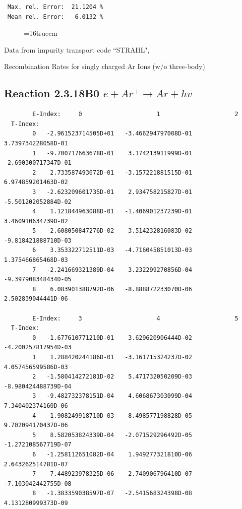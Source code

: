 \documentclass[12pt,dvipdfmx]{article}
\begin{document}
\begin{small}
\begin{verbatim}
 Max. rel. Error:  21.1204 %
 Mean rel. Error:   6.0132 %

\end{verbatim}\end{small}
\begin{figure} \label{2.3.10B1}
\epsfxsize=16truecm
\end{figure}
\newpage
Data from impurity transport code ``STRAHL", \cite{kn:Behringer}

  Recombination Rates for singly charged Ar Ions (w/o three-body)
\subsection{
Reaction 2.3.18B0  $  e + Ar^+ \rightarrow  Ar + hv $
}


\begin{small}\begin{verbatim}
        E-Index:     0                     1                     2
  T-Index:
        0   -2.961523714505D+01   -3.466294797008D-01    3.739734228058D-01
        1   -9.700717663678D-01    3.174213911999D-01   -2.690300717347D-01
        2    2.733587493672D-01   -3.157221881515D-01    6.974859201463D-02
        3   -2.623209601735D-01    2.934758215827D-01   -5.501202052884D-02
        4    1.121844963088D-01   -1.406901237239D-01    3.460910634739D-02
        5   -2.608050847276D-02    3.514232816083D-02   -9.818421888710D-03
        6    3.353322712511D-03   -4.716045851013D-03    1.375466865468D-03
        7   -2.241669321389D-04    3.232299270856D-04   -9.397908348434D-05
        8    6.083901388792D-06   -8.888872233070D-06    2.502839044441D-06

        E-Index:     3                     4                     5
  T-Index:
        0   -1.677610771210D-01    3.629620906444D-02   -4.200257817954D-03
        1    1.288420244186D-01   -3.161715324237D-02    4.057456599586D-03
        2   -1.580414272181D-02    5.471732050209D-03   -8.980424488739D-04
        3   -9.482732378151D-04    4.606867303099D-04    7.340402374160D-06
        4   -1.908249918710D-03   -8.498577198828D-05    9.702094170437D-06
        5    8.582053824339D-04   -2.071529296492D-05   -1.272108567719D-07
        6   -1.258112651082D-04    1.949277321810D-06    2.643262514781D-07
        7    7.448923978325D-06    2.740906796410D-07   -7.103042442755D-08
        8   -1.383359038597D-07   -2.541568324398D-08    4.131280999373D-09


\end{verbatim}
\end{small}
\end{document}
